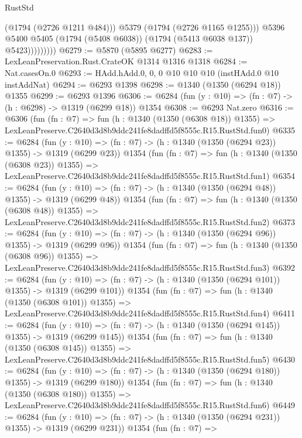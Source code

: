 \begin{lexlean}{RustStd}
\begin{coremodule}
                          (@1794 (@2726 @1211 @484)))
                        @5379
                        (@1794 (@2726 @1165 @1255)))
                      @5396
                      @5400
                      @5405
                      (@1794 (@5408 @6038))
                      (@1794 (@5413 @6038 @137))
                      @5423)))))))))
@6279 := @5870 (@5895 @6277)
@6283 := LexLeanPreservation.Rust.CrateOK @1314 @1316 @1318
@6284 := Nat.casesOn.{0}
@6293 := HAdd.hAdd.{0, 0, 0} @10 @10 @10 (instHAdd.{0} @10 instAddNat)
@6294 := @6293 @1398
@6298 := @1340 (@1350 (@6294 @18)) @1355
@6299 := @6293 @1396
@6306 := @6284 (fun (y : @10) => (fn : @7) -> (h : @6298) -> @1319 (@6299 @18)) @1354
@6308 := @6293 Nat.zero
@6316 := @6306
    (fun (fn : @7) =>
    fun (h : @1340 (@1350 (@6308 @18)) @1355) =>
    LexLeanPreserve.C2640d3d8b9ddc241fe8dadffd5f8555c.R15.RustStd.fun0)
@6335 := @6284
    (fun (y : @10) => (fn : @7) -> (h : @1340 (@1350 (@6294 @23)) @1355) -> @1319 (@6299 @23))
    @1354
    (fun (fn : @7) =>
    fun (h : @1340 (@1350 (@6308 @23)) @1355) =>
    LexLeanPreserve.C2640d3d8b9ddc241fe8dadffd5f8555c.R15.RustStd.fun1)
@6354 := @6284
    (fun (y : @10) => (fn : @7) -> (h : @1340 (@1350 (@6294 @48)) @1355) -> @1319 (@6299 @48))
    @1354
    (fun (fn : @7) =>
    fun (h : @1340 (@1350 (@6308 @48)) @1355) =>
    LexLeanPreserve.C2640d3d8b9ddc241fe8dadffd5f8555c.R15.RustStd.fun2)
@6373 := @6284
    (fun (y : @10) => (fn : @7) -> (h : @1340 (@1350 (@6294 @96)) @1355) -> @1319 (@6299 @96))
    @1354
    (fun (fn : @7) =>
    fun (h : @1340 (@1350 (@6308 @96)) @1355) =>
    LexLeanPreserve.C2640d3d8b9ddc241fe8dadffd5f8555c.R15.RustStd.fun3)
@6392 := @6284
    (fun (y : @10) => (fn : @7) -> (h : @1340 (@1350 (@6294 @101)) @1355) -> @1319 (@6299 @101))
    @1354
    (fun (fn : @7) =>
    fun (h : @1340 (@1350 (@6308 @101)) @1355) =>
    LexLeanPreserve.C2640d3d8b9ddc241fe8dadffd5f8555c.R15.RustStd.fun4)
@6411 := @6284
    (fun (y : @10) => (fn : @7) -> (h : @1340 (@1350 (@6294 @145)) @1355) -> @1319 (@6299 @145))
    @1354
    (fun (fn : @7) =>
    fun (h : @1340 (@1350 (@6308 @145)) @1355) =>
    LexLeanPreserve.C2640d3d8b9ddc241fe8dadffd5f8555c.R15.RustStd.fun5)
@6430 := @6284
    (fun (y : @10) => (fn : @7) -> (h : @1340 (@1350 (@6294 @180)) @1355) -> @1319 (@6299 @180))
    @1354
    (fun (fn : @7) =>
    fun (h : @1340 (@1350 (@6308 @180)) @1355) =>
    LexLeanPreserve.C2640d3d8b9ddc241fe8dadffd5f8555c.R15.RustStd.fun6)
@6449 := @6284
    (fun (y : @10) => (fn : @7) -> (h : @1340 (@1350 (@6294 @231)) @1355) -> @1319 (@6299 @231))
    @1354
    (fun (fn : @7) =>

\end{coremodule}
\end{lexlean}
